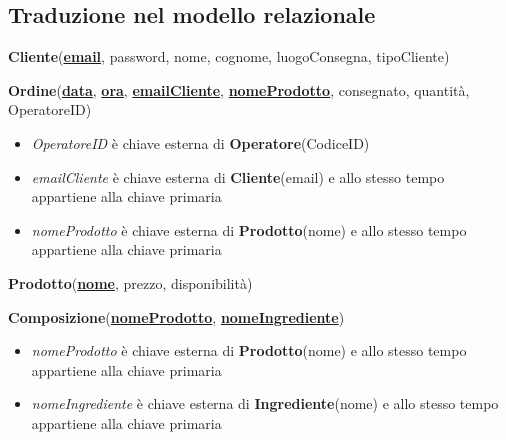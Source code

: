 \documentclass[12pt,a4paper]{article}
\begin{document}
    \subsection{Traduzione nel modello relazionale}
    \begin{tcolorbox}[
        colback=gray!8,
        colframe=black!30,
        title=
    ]
        \textbf{Cliente}(\textbf{\uline{email}}, password, nome, cognome, luogoConsegna, tipoCliente)
    \end{tcolorbox}

    \begin{tcolorbox}[
        colback=gray!8,
        colframe=black!30,
        title=
    ]
        \textbf{Ordine}(\uline{\textbf{data}}, \textbf{\uline{ora}}, \textbf{\uline{emailCliente}}, \textbf{\uline{nomeProdotto}}, consegnato, quantità, OperatoreID)
        \begin{itemize}[leftmargin=1em]
            \item \textit{OperatoreID} è chiave esterna di \textbf{Operatore}(CodiceID)
            \item \textit{emailCliente} è chiave esterna di \textbf{Cliente}(email) e allo stesso tempo appartiene alla chiave primaria
            \item \textit{nomeProdotto} è chiave esterna di \textbf{Prodotto}(nome) e allo stesso tempo appartiene alla chiave primaria
        \end{itemize}
    \end{tcolorbox}
    
    \begin{tcolorbox}[
        colback=gray!8,
        colframe=black!30,
        title=
    ]
        \textbf{Prodotto}(\textbf{\uline{nome}}, prezzo, disponibilità)
    \end{tcolorbox}

    \begin{tcolorbox}[
        colback=gray!8,
        colframe=black!30,
        title=
    ]
        \textbf{Composizione}(\textbf{\uline{nomeProdotto}}, \textbf{\uline{nomeIngrediente}})
        \begin{itemize}[leftmargin=1em]
            \item \textit{nomeProdotto} è chiave esterna di \textbf{Prodotto}(nome) e allo stesso tempo appartiene alla chiave primaria
            \item \textit{nomeIngrediente} è chiave esterna di \textbf{Ingrediente}(nome) e allo stesso tempo appartiene alla chiave primaria
        \end{itemize}
    \end{tcolorbox}
\end{document}
